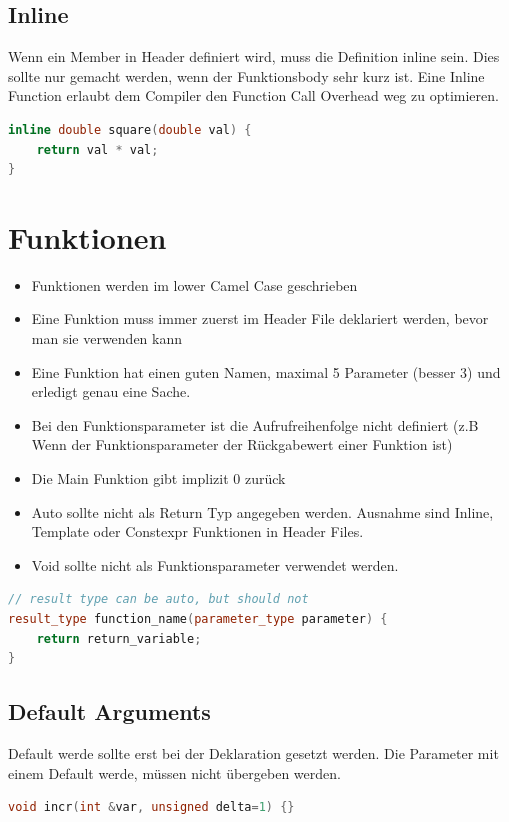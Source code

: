 \subsection{Inline}
Wenn ein Member in Header definiert wird, muss die Definition inline sein. Dies sollte nur gemacht werden, wenn der Funktionsbody sehr kurz ist. Eine Inline Function erlaubt dem Compiler den Function Call Overhead weg zu optimieren.
\begin{lstlisting}[language=C++]
inline double square(double val) {
	return val * val;
}
\end{lstlisting}


\section{Funktionen}
\begin{itemize}
	\item Funktionen werden im lower Camel Case geschrieben
	\item Eine Funktion muss immer zuerst im Header File deklariert werden, bevor man sie verwenden kann
	\item Eine Funktion hat einen guten Namen, maximal 5 Parameter (besser 3) und erledigt genau eine Sache.
	\item Bei den Funktionsparameter ist die Aufrufreihenfolge nicht definiert (z.B Wenn der Funktionsparameter der Rückgabewert einer Funktion ist)
	\item Die Main Funktion gibt implizit 0 zurück
	\item Auto sollte nicht als Return Typ angegeben werden. Ausnahme sind Inline, Template oder Constexpr Funktionen in Header Files.
	\item Void sollte nicht als Funktionsparameter verwendet werden.
\end{itemize}
\begin{lstlisting}[language=C++]
// result type can be auto, but should not
result_type function_name(parameter_type parameter) {
	return return_variable;
}
\end{lstlisting}

\subsection{Default Arguments}
Default werde sollte erst bei der Deklaration gesetzt werden. Die Parameter mit einem Default werde, müssen nicht übergeben werden.
\begin{lstlisting}[language=C++]
void incr(int &var, unsigned delta=1) {}
\end{lstlisting}

